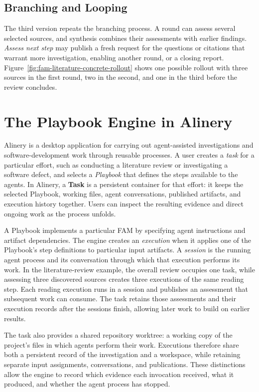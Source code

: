 \documentclass[letterpaper]{article}
\theoremstyle{definition}
\begin{document}
\subsection{Branching and Looping}

The third version repeats the branching process. A round can assess several
selected sources, and synthesis combines their assessments with earlier
findings. \emph{Assess next step} may publish a fresh request for the questions
or citations that warrant more investigation, enabling another round, or a
closing report. Figure~\ref{fig:fam-literature-concrete-rollout} shows one
possible rollout with three sources in the first round, two in the second,
and one in the third before the review concludes.

\section{The Playbook Engine in Alinery}
\label{sec:playbook-engine}

Alinery is a desktop application for carrying out agent-assisted
investigations and software-development work through reusable processes.
A user creates a \emph{task} for a particular effort, such as conducting a
literature review or investigating a software defect, and selects a
\emph{Playbook} that defines the steps available to the agents. In Alinery,
a \textbf{Task} is a persistent container for that effort: it keeps the selected Playbook, working files, agent conversations,
published artifacts, and execution history together. Users can inspect the
resulting evidence and direct ongoing work as the process unfolds.

A Playbook implements a particular FAM by specifying agent instructions and
artifact dependencies. The engine creates an \emph{execution} when it
applies one of the Playbook's step definitions to particular input artifacts.
A \emph{session} is the running agent process and its conversation through
which that execution performs its work. In the literature-review example,
the overall review occupies one task, while assessing three discovered
sources creates three executions of the same reading step. Each reading
execution runs in a session and publishes an assessment that subsequent
work can consume. The task retains those assessments and their execution
records after the sessions finish, allowing later work to build on earlier
results.

The task also provides a shared repository worktree: a working copy of the
project's files in which agents perform their work. Executions therefore
share both a persistent record of the investigation and a workspace, while
retaining separate input assignments, conversations, and publications.
These distinctions allow the engine to record which evidence each
invocation received, what it produced, and whether the agent process has
stopped.
\end{document}
